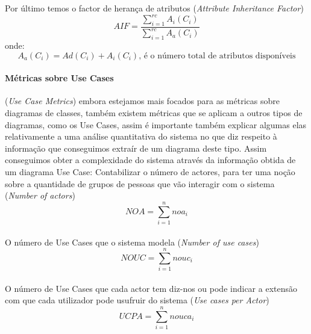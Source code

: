 Por último temos o factor de herança de atributos (\textit{Attribute Inheritance Factor}) $$AIF = \frac{\sum_{i=1}^{rc} A_i(C_i)}{\sum_{i=1}^{rc} A_a(C_i)} $$
onde:
$$ A_a(C_i) = Ad(C_i) + A_i(C_i)\textrm{, é o número total de atributos disponíveis}$$
\paragraph{Métricas sobre Use Cases} (\textit{Use Case Metrics}) embora estejamos mais focados para as métricas sobre diagramas de classes,
também existem métricas que se aplicam a outros tipos de diagramas, como os Use Cases, assim é importante também explicar algumas elas
relativamente a uma análise quantitativa do sistema no que diz respeito à informação que conseguimos extraír de um diagrama deste tipo.
Assim conseguimos obter a complexidade do sistema através da informação obtida de um diagrama Use Case:
Contabilizar o número de actores, para ter uma noção sobre a quantidade de grupos de pessoas que
vão interagir com o sistema (\textit{Number of actors})  $$NOA = \sum_{i=1}^{n} noa_i $$
\\
O número de Use Cases que o sistema modela (\textit{Number of use cases})  $$NOUC = \sum_{i=1}^{n} nouc_i $$
\\
O número de Use Cases que cada actor tem diz-nos ou pode indicar a extensão com que cada utilizador pode
usufruir do sistema (\textit{Use cases per Actor}) $$UCPA = \sum_{i=1}^{n} nouca_i $$
